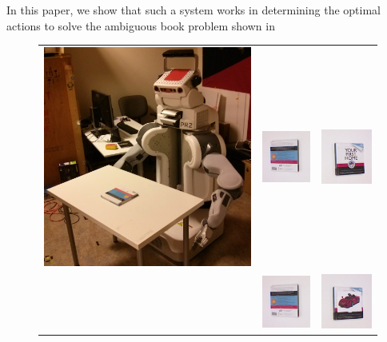     In this paper, we show that such a system works in determining the optimal actions to solve the ambiguous book problem shown in 

    \setlength{\tabcolsep}{0.1em}
    \begin{figure}[ht]
    \centering
    \begin{tabular}{cccc}
    \multicolumn{2}{c}{\multirow{-9}{*}{\includegraphics[width=0.46\columnwidth]{pics/pr2_init.jpg}}} & \includegraphics[width=0.23\columnwidth]{pics/first_back.jpg} 
    &\includegraphics[width=0.23\columnwidth]{pics/first_cover1.jpg} \\
    \multicolumn{2}{c}{} & \includegraphics[width=0.23\columnwidth]{pics/first_back.jpg} 
    &\includegraphics[width=0.23\columnwidth]{pics/first_cover2.jpg} \\

\end{tabular}
\end{figure}
